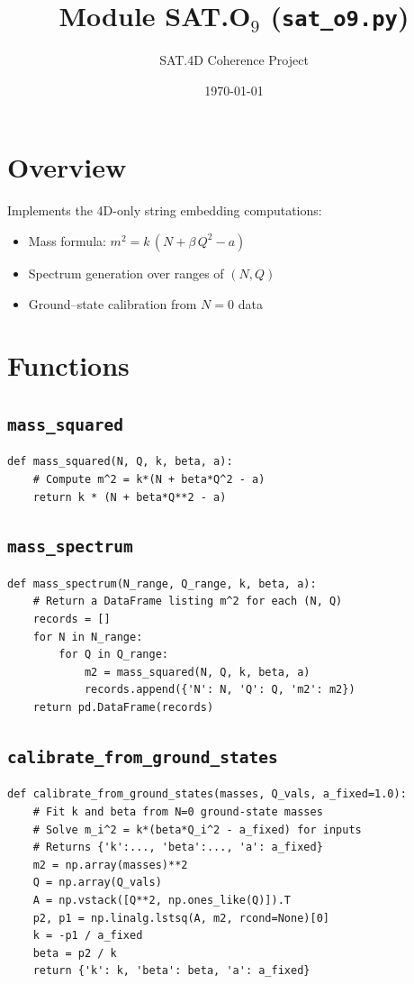 \documentclass[12pt]{article}
\begin{document}
\title{Module SAT.O$_9$ (\texttt{sat\_o9.py})}
\author{SAT.4D Coherence Project}
\date{\today}
\maketitle

\section*{Overview}
Implements the 4D-only string embedding computations:
\begin{itemize}
  \item Mass formula: \(m^2 = k\,(N + \beta\,Q^2 - a)\)
  \item Spectrum generation over ranges of \((N,Q)\)
  \item Ground–state calibration from \(N=0\) data
\end{itemize}

\section{Functions}

\subsection{\texttt{mass\_squared}}
\begin{verbatim}
def mass_squared(N, Q, k, beta, a):
    # Compute m^2 = k*(N + beta*Q^2 - a)
    return k * (N + beta*Q**2 - a)
\end{verbatim}

\subsection{\texttt{mass\_spectrum}}
\begin{verbatim}
def mass_spectrum(N_range, Q_range, k, beta, a):
    # Return a DataFrame listing m^2 for each (N, Q)
    records = []
    for N in N_range:
        for Q in Q_range:
            m2 = mass_squared(N, Q, k, beta, a)
            records.append({'N': N, 'Q': Q, 'm2': m2})
    return pd.DataFrame(records)
\end{verbatim}

\subsection{\texttt{calibrate\_from\_ground\_states}}
\begin{verbatim}
def calibrate_from_ground_states(masses, Q_vals, a_fixed=1.0):
    # Fit k and beta from N=0 ground-state masses
    # Solve m_i^2 = k*(beta*Q_i^2 - a_fixed) for inputs
    # Returns {'k':..., 'beta':..., 'a': a_fixed}
    m2 = np.array(masses)**2
    Q = np.array(Q_vals)
    A = np.vstack([Q**2, np.ones_like(Q)]).T
    p2, p1 = np.linalg.lstsq(A, m2, rcond=None)[0]
    k = -p1 / a_fixed
    beta = p2 / k
    return {'k': k, 'beta': beta, 'a': a_fixed}
\end{verbatim}
\end{document}
